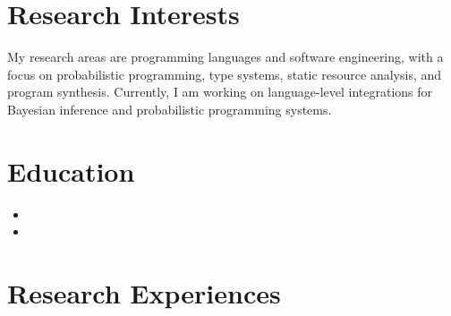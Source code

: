 \documentclass[11pt,letterpaper,roman]{moderncv}        %
\begin{document}
\makecvtitle


\section{Research Interests}

My research areas are programming languages and software engineering, with a focus on probabilistic programming, type systems, static resource analysis, and program synthesis.
Currently, I am working on language-level integrations for Bayesian inference and probabilistic programming systems.

\section{Education}

\begin{itemize}
  \item{}

  \vspace{4pt}

  \item{}
\end{itemize}

\section{Research Experiences}
\end{document}
